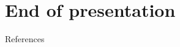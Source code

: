 \documentclass[utf8,aspectratio=169,ngerman,english]{beamer}
\newcommand{\nPC}{\hyperref[eq:nPC]{\texttt{(nPC1)}}\xspace}
\newcommand{\nPCE}{\hyperref[eq:nPCE]{\texttt{(nPC3)}}\xspace}
\newcommand{\nPCY}{\hyperref[eq:nPCY]{\texttt{(nPC2)}}\xspace}
\begin{document}

\maketitle

\section*{End of presentation}


\begin{frame}[allowframebreaks]{References}
    \printbibliography
\end{frame}
\end{document}
